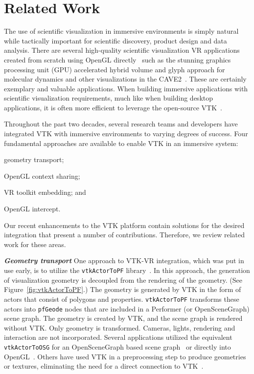 \section{Related Work}

The use of scientific visualization in immersive environments is simply natural while tactically important for scientific discovery, product design and data analysis.
There are several high-quality scientific visualization VR applications created from scratch using OpenGL directly~\cite{Billen:2008, LaViola:2007, Schulze:2001, Rantzau:1998} such as the stunning graphics processing unit (GPU) accelerated hybrid volume and glyph approach for molecular dynamics and other visualizations in the CAVE2\texttrademark~\cite{Reda:2013, Reda:2013a}.
These are certainly exemplary and valuable applications.
When building immersive applications with scientific visualization requirements, much like when building desktop applications, it is often more efficient to leverage the open-source VTK~\cite{Schroeder:2004}.

Throughout the past two decades, several research teams and developers have integrated VTK with immersive environments to varying degrees of success.
Four fundamental approaches are available to enable VTK in an immersive system:

\begin{compactitem}
\item geometry transport;
\item OpenGL context sharing;
\item VR toolkit embedding; and
\item OpenGL intercept.
\end{compactitem}

Our recent enhancements to the VTK platform contain solutions for the desired integration that present a number of contributions. Therefore, we review related work for these areas.

\textbf{\textit{Geometry transport}}
One approach to VTK-VR integration, which was put in use early, is to utilize the \texttt{vtkActorToPF} library~\cite{Leigh98limbo/vtk}.
In this approach, the generation of visualization geometry is decoupled from
the rendering of the geometry. (See Figure~\ref{fig:vtkActorToPF}.) 
The geometry is generated by VTK in the form of actors that consist of polygons and properties.
\texttt{vtkActorToPF} transforms these actors into \texttt{pfGeode} nodes that are included in a Performer (or OpenSceneGraph) scene graph. The geometry is created by VTK, and the scene graph is rendered without VTK. Only geometry is transformed. Cameras, lights, rendering and interaction are not incorporated. Several applications utilized the equivalent \texttt{vtkActorToOSG} for an OpenSceneGraph based scene graph~\cite{VE-Suite:2016} or directly into OpenGL~\cite{Ohno:2006}. Others have used VTK in a preprocessing step to produce geometries or textures, eliminating the need for a direct connection to VTK~\cite{Bivins:2005}.

